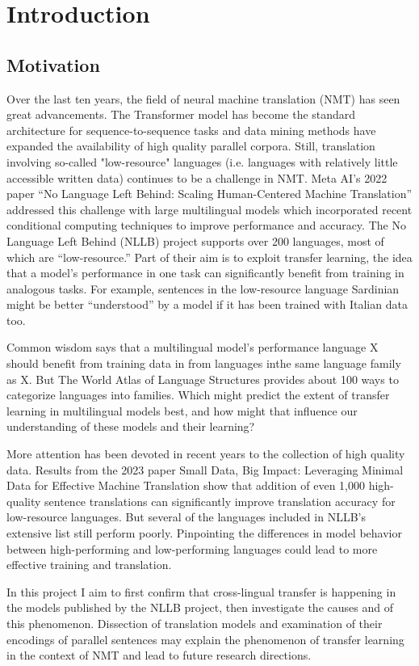 

\chapter{Introduction}
\label{chap:introduction}

\section{Motivation}

Over the last ten years, the field of neural machine translation (NMT) has seen great advancements. The Transformer model \cite{vaswani2017attention} has become the standard architecture for sequence-to-sequence tasks and data mining methods \cite{schwenk-etal-2021-ccmatrix} have expanded the availability of high quality parallel corpora. Still, translation involving so-called "low-resource" languages (i.e. languages with relatively little accessible written data) continues to be a challenge in NMT. Meta AI’s 2022 paper “No Language Left Behind: Scaling Human-Centered Machine Translation” \cite{nllbteam2022language} addressed this challenge with large multilingual models which incorporated recent conditional computing techniques \cite{lepikhin2020gshard} to improve performance and accuracy. The No Language Left Behind (NLLB) project supports over 200 languages, most of which are “low-resource.” Part of their aim is to exploit transfer learning, the idea that a model’s performance in one task can significantly benefit from training in analogous tasks. For example, sentences in the low-resource language Sardinian might be better “understood” by a model if it has been trained with Italian data too. 

Common wisdom says that a multilingual model’s performance language X  should benefit from training data in from languages inthe same language family as X. But The World Atlas of Language Structures \cite{wals} provides about 100 ways to categorize languages into families. Which might predict the extent of transfer learning in multilingual models best, and how might that influence our understanding of these models and their learning?

More attention has been devoted in recent years to the collection of high quality data. Results from the 2023 paper Small Data, Big Impact: Leveraging Minimal Data for Effective Machine Translation \cite{maillard-etal-2023-small} show that addition of even 1,000 high-quality sentence translations can significantly improve translation accuracy for low-resource languages. But several of the languages included in NLLB’s extensive list still perform poorly. Pinpointing the differences in model behavior between high-performing and low-performing languages could lead to more effective training and translation.

In this project I aim to first confirm that cross-lingual transfer is happening in the models published by the NLLB project, then investigate the causes and of this phenomenon. Dissection of translation models and examination of their encodings of parallel sentences may explain the phenomenon of transfer learning in the context of NMT and lead to future research directions.

